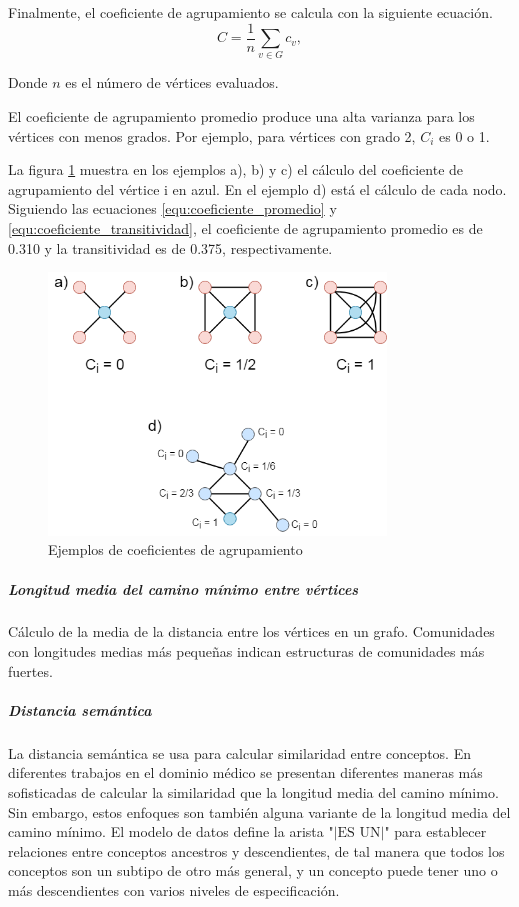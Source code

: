 Finalmente, el coeficiente de agrupamiento se calcula con la siguiente ecuación.
\begin{equation}
\label{equ:coeficiente_promedio}
C = \frac{1}{n}\sum_{v \in G} c_v,
\end{equation}

Donde $n$ es el número de vértices evaluados. 

El coeficiente de agrupamiento promedio produce una alta varianza para los vértices con menos grados. Por ejemplo, para vértices con grado 2, $C_{i}$ es 0 o 1.\cite{Tang2010} %

La figura \ref{fig:ejemplocoeficienteagrupamiento} muestra en los ejemplos a), b) y c) el cálculo del coeficiente de agrupamiento del vértice i en azul. En el ejemplo d) está el cálculo de cada nodo. Siguiendo las ecuaciones \ref{equ:coeficiente_promedio} y \ref{equ:coeficiente_transitividad}, el coeficiente de agrupamiento promedio es de \num{0.310} y la transitividad es de \num{0.375}, respectivamente.

\begin{figure}
\caption{Ejemplos de coeficientes de agrupamiento}
\label{fig:ejemplocoeficienteagrupamiento}
\centering
\includegraphics[width=0.8\textwidth]{Images/coeficiente_de_agrupamiento.png}
\end{figure}

\subparagraph{Longitud media del camino mínimo entre vértices}
Cálculo de la media de la distancia entre los vértices en un grafo. Comunidades con longitudes medias más pequeñas indican estructuras de comunidades más fuertes.

\subparagraph{Distancia semántica}
La distancia semántica se usa para calcular similaridad entre conceptos. En diferentes trabajos en el dominio médico \cite{Wang2010,Gan2013,Pedersen2007,Zare2015ASNOMED-CT} se presentan diferentes maneras más sofisticadas de calcular la similaridad que la longitud media del camino mínimo. Sin embargo, estos enfoques son también alguna variante de la longitud media del camino mínimo.
El modelo de datos define la arista "$|\text{ES UN}|$" para establecer relaciones entre conceptos ancestros y descendientes, de tal manera que todos los conceptos son un subtipo de otro más general, y un concepto puede tener uno o más descendientes con varios niveles de especificación.


